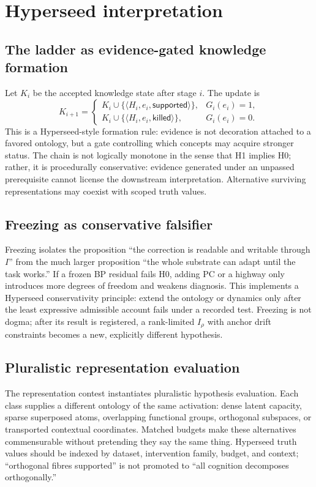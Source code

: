 \documentclass[11pt]{article}
\begin{document}
\section{Hyperseed interpretation}

\subsection{The ladder as evidence-gated knowledge formation}

Let $K_i$ be the accepted knowledge state after stage $i$.  The update is
\[
 K_{i+1}=
 \begin{cases}
 K_i\cup\{\langle H_i,e_i,\textsf{supported}\rangle\},&G_i(e_i)=1,\\
 K_i\cup\{\langle H_i,e_i,\textsf{killed}\rangle\},&G_i(e_i)=0.
 \end{cases}
\]
This is a Hyperseed-style formation rule: evidence is not decoration attached
to a favored ontology, but a gate controlling which concepts may acquire
stronger status.  The chain is not logically monotone in the sense that H1
implies H0; rather, it is procedurally conservative: evidence generated under
an unpassed prerequisite cannot license the downstream interpretation.
Alternative surviving representations may coexist with scoped truth values.

\subsection{Freezing as conservative falsifier}

Freezing isolates the proposition ``the correction is readable and writable
through $I$'' from the much larger proposition ``the whole substrate can adapt
until the task works.''  If a frozen BP residual fails H0, adding PC or a
highway only introduces more degrees of freedom and weakens diagnosis.  This
implements a Hyperseed conservativity principle: extend the ontology or
dynamics only after the least expressive admissible account fails under a
recorded test.  Freezing is not dogma; after its result is registered, a
rank-limited $I_\rho$ with anchor drift constraints becomes a new, explicitly
different hypothesis.

\subsection{Pluralistic representation evaluation}

The representation contest instantiates pluralistic hypothesis evaluation.
Each class supplies a different ontology of the same activation:
dense latent capacity, sparse superposed atoms, overlapping functional groups,
orthogonal subspaces, or transported contextual coordinates.  Matched budgets
make these alternatives commensurable without pretending they say the same
thing.  Hyperseed truth values should be indexed by dataset, intervention
family, budget, and context; ``orthogonal fibres supported'' is not promoted
to ``all cognition decomposes orthogonally.''
\end{document}
